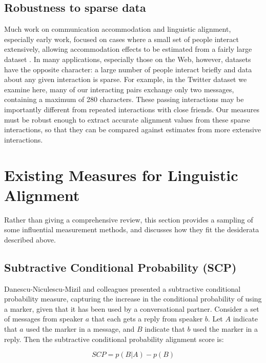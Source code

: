 \documentclass{acm_proc_article-sp}
\begin{document}
\subsection{Robustness to sparse data} 

Much work on communication accommodation and linguistic alignment, especially early work, focused on cases where a small set of people interact extensively, allowing accommodation effects to be estimated from a fairly large dataset \cite{Ferrara1991,GonzalesHancockPennebaker2010,IrelandEtAl2011}.  In many applications, especially those on the Web, however, datasets have the opposite character: a large number of people interact briefly and data about any given interaction is sparse. For example, in the Twitter dataset we examine here, many of our interacting pairs exchange only two messages, containing a maximum of 280 characters. These passing interactions may be importantly different from repeated interactions with close friends.  Our measures must be robust enough to extract accurate alignment values from these sparse interactions, so that they can be compared against estimates from more extensive interactions.  

\section{Existing Measures for Linguistic Alignment}
Rather than giving a comprehensive review, this section provides a sampling of some influential measurement methods, and discusses how they fit the desiderata described above.  


\subsection{Subtractive Conditional Probability (SCP)} 

Danescu-Niculescu-Mizil and colleagues \cite{DNMGamonDumais2011} presented a subtractive conditional probability measure, capturing the increase in the conditional probability of using a marker, given that it has been used by a conversational partner.  Consider a set of messages from speaker $a$ that each gets a reply from speaker $b$.  Let $A$ indicate that $a$ used the marker in a message, and $B$ indicate that $b$ used the marker in a reply.  Then the subtractive conditional probability alignment score is:

\begin{equation}
SCP = p(B|A) - p(B)
\end{equation}
\end{document}
